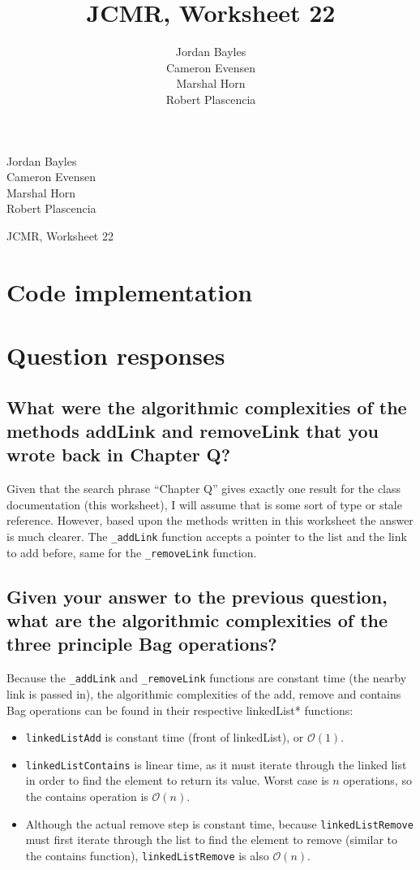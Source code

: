 \documentclass[10pt,letterpaper]{article}
\author{Jordan Bayles\\
        Cameron Evensen\\
        Marshal Horn\\
        Robert Plascencia}
\title{JCMR, Worksheet 22}
\begin{document}
\begin{flushright}
Jordan Bayles\\
Cameron Evensen\\
Marshal Horn\\
Robert Plascencia
\end{flushright}

\begin{center}
JCMR, Worksheet 22
\end{center}

\section{Code implementation}

\newpage

\section{Question responses}
\subsection
{
What were the algorithmic complexities of the methods addLink and removeLink
that you wrote back in Chapter Q?
}
Given that the search phrase ``Chapter Q'' gives exactly one result for the class
documentation (this worksheet), I will assume that is some sort of type or
stale reference. However, based upon the methods written in this worksheet
the answer is much clearer. The \verb!_addLink! function accepts a pointer
to the list and the link to add before, same for the \verb!_removeLink! function.

\subsection
{
Given your answer to the previous question, what are the algorithmic complexities
of the three principle Bag operations?
}
Because the \verb!_addLink! and \verb!_removeLink! functions are constant time
(the nearby link is passed in), the algorithmic complexities of the add,
remove and contains Bag operations can be found in their respective linkedList*
functions:

\begin{itemize}
    \item \verb!linkedListAdd! is constant time (front of linkedList), or
        $\mathcal{O}( 1 )$.
    \item \verb!linkedListContains! is linear time, as it must iterate through
        the linked list in order to find the element to return its value. Worst
        case is $n$ operations, so the contains operation is $\mathcal{O}(n)$.
    \item Although the actual remove step is constant time, because \verb!linkedListRemove!
        must first iterate through the list to find the element to remove (similar
        to the contains function), \verb!linkedListRemove! is also $\mathcal{O}(n)$.
\end{itemize}
\end{document}
